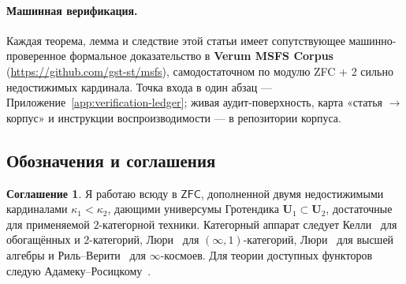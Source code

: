 \documentclass[11pt]{article}
\theoremstyle{plain}
\theoremstyle{definition}
\newtheorem{convention}[theorem]{Соглашение}
\newcommand{\ZFC}{\mathsf{ZFC}}
\begin{document}
\paragraph{Машинная верификация.}  Каждая теорема, лемма и следствие этой статьи имеет сопутствующее машинно-проверенное формальное доказательство в \textbf{Verum MSFS Corpus} (\url{https://github.com/gst-st/msfs}), самодостаточном по модулю ZFC + 2 сильно недостижимых кардинала.  Точка входа в один абзац — Приложение~\ref{app:verification-ledger}; живая аудит-поверхность, карта «статья $\to$ корпус» и инструкции воспроизводимости — в репозитории корпуса.

\subsection{Обозначения и соглашения}

\begin{convention}\label{conv:zfc-inacc}
Я работаю всюду в $\ZFC$, дополненной двумя недостижимыми кардиналами $\kappa_1 < \kappa_2$, дающими универсумы Гротендика $\mathbf{U}_1 \subset \mathbf{U}_2$, достаточные для применяемой $2$-категорной техники. Категорный аппарат следует Келли~\cite{Kelly1982} для обогащённых и $2$-категорий, Люри~\cite{LurieHTT} для $(\infty, 1)$-категорий, Люри~\cite{LurieHA} для высшей алгебры и Риль--Верити~\cite{RiehlVerity2022} для $\infty$-космоев. Для теории доступных функторов следую Адамеку--Росицкому~\cite{AdamekRosicky1994}.
\end{convention}
\end{document}

